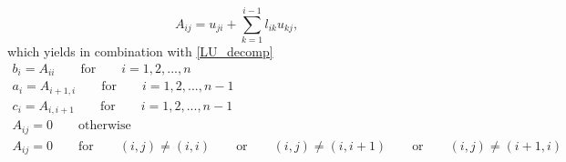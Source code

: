 \documentclass[english,notitlepage]{revtex4-1}  %
\begin{document}
\begin{equation}\label{matrix_elements}
	A_{ij} = u_{ji} + \sum_{k = 1}^{i-1} l_{ik}u_{kj},
\end{equation}
which yields in combination with \eqref{LU_decomp}
\begin{gather}
	b_i = A_{ii} \qquad \text{for} \qquad i = 1,2,...,n \\
	a_i = A_{i+1,i} \qquad \text{for} \qquad i = 1,2,...,n-1 \\
	c_i = A_{i, i+1} \qquad \text{for} \qquad i = 1,2,...,n-1\\ 
	A_{ij} = 0 \qquad \text{otherwise}\\
	A_{ij} = 0 \qquad \text{for} \qquad (i,j) \neq (i,i) \qquad  \text{or} \qquad (i,j) \neq (i,i+1) \qquad \text{or} \qquad (i,j) \neq (i+1,i)
\end{gather}
\end{document}
